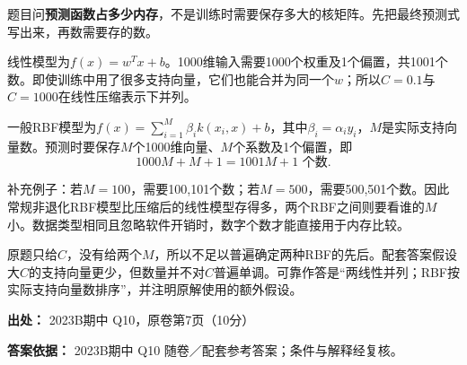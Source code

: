 题目问\textbf{预测函数占多少内存}，不是训练时需要保存多大的核矩阵。先把最终预测式写出来，再数需要存的数。


线性模型为\(f(x)=w^Tx+b\)。1000维输入需要1000个权重及1个偏置，共1001个数。即使训练中用了很多支持向量，它们也能合并为同一个\(w\)；所以\(C=0.1\)与\(C=1000\)在线性压缩表示下并列。


一般RBF模型为\(f(x)=\sum_{i=1}^{M}\beta_i k(x_i,x)+b\)，其中\(\beta_i=\alpha_i y_i\)，\(M\)是实际支持向量数。预测时要保存\(M\)个1000维向量、\(M\)个系数及1个偏置，即
\[
1000M+M+1=1001M+1\text{ 个数}.
\]


补充例子：若\(M=100\)，需要100,101个数；若\(M=500\)，需要500,501个数。因此常规非退化RBF模型比压缩后的线性模型存得多，两个RBF之间则要看谁的\(M\)小。数据类型相同且忽略软件开销时，数字个数才能直接用于内存比较。


原题只给\(C\)，没有给两个\(M\)，所以不足以普遍确定两种RBF的先后。配套答案假设大\(C\)的支持向量更少，但数量并不对\(C\)普遍单调。可靠作答是“两线性并列；RBF按实际支持向量数排序”，并注明原解使用的额外假设。


\textbf{出处：} 2023B期中 Q10，原卷第7页（10分）


\textbf{答案依据：} 2023B期中 Q10 随卷／配套参考答案；条件与解释经复核。
